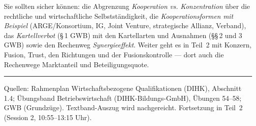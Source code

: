 \documentclass[11pt, a4paper]{article}
\begin{document}
\begin{merksatz}[title={\bfseries Wichtig für die Prüfungsvorbereitung (Teil 1)}]
Sie sollten sicher können: die Abgrenzung \emph{Kooperation vs. Konzentration} über die
rechtliche und wirtschaftliche Selbstständigkeit, die \emph{Kooperationsformen mit
Beispiel} (ARGE/Konsortium, IG, Joint Venture, strategische Allianz, Verband), das
\emph{Kartellverbot} (\S\,1 GWB) mit den Kartellarten und Ausnahmen (\S\S\,2 und 3 GWB) sowie den
Rechenweg \emph{Synergieeffekt}. Weiter geht es in Teil~2 mit Konzern, Fusion, Trust,
den Richtungen und der Fusionskontrolle --- dort auch die Rechenwege Marktanteil und
Beteiligungsquote.
\end{merksatz}

\vspace{1em}
\hrule
\vspace{0.8em}
\noindent\textsf{\small Quellen: Rahmenplan Wirtschaftsbezogene Qualifikationen (DIHK), Abschnitt 1.4;
Übungsband Betriebswirtschaft (DIHK-Bildungs-GmbH), Übungen 54--58; GWB (Grundzüge).
Textband-Auszug wird nachgereicht. Fortsetzung in Teil~2 (Session 2, 10:55--13:15 Uhr).}
\end{document}
